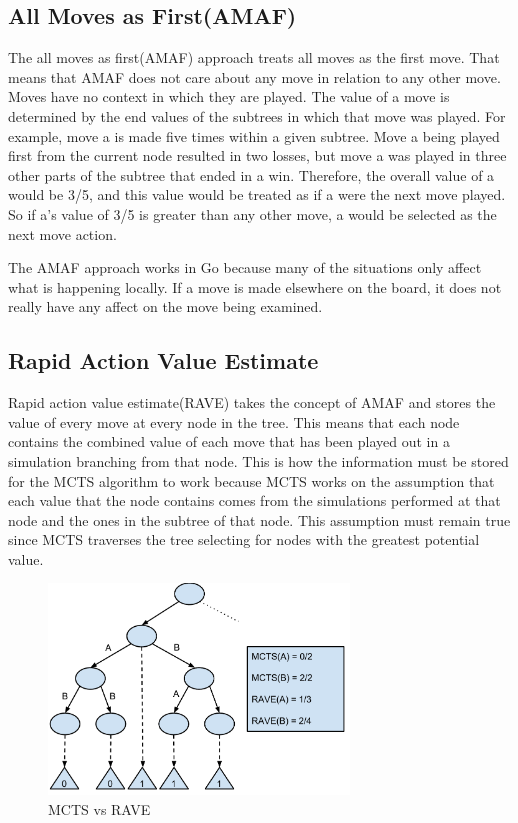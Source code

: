 \documentclass{sig-alternate}
\begin{document}
\subsection{All Moves as First(AMAF)}
The all moves as first(AMAF) approach treats all moves as the first move. That means that AMAF does not care about any move in relation to any other move. Moves have no context in which they are played. The value of a move is determined by the end values of the subtrees in which that move was played. For example, move a is made five times within a given subtree. Move a being played first from the current node resulted in two losses, but move a was played in three other parts of the subtree that ended in a win. Therefore, the overall value of a would be 3/5, and this value would be treated as if a were the next move played. So if a's value of 3/5 is greater than any other move, a would be selected as the next move action.

The AMAF approach works in Go because many of the situations only affect what is happening locally. If a move is made elsewhere on the board, it does not really have any affect on the move being examined.

\subsection{Rapid Action Value Estimate}
Rapid action value estimate(RAVE) takes the concept of AMAF and stores the value of every move at every node in the tree. This means that each node contains the combined value of each move that has been played out in a simulation branching from that node. This is how the information must be stored for the MCTS algorithm to work because MCTS works on the assumption that each value that the node contains comes from the simulations performed at that node and the ones in the subtree of that node. This assumption must remain true since MCTS traverses the tree selecting for nodes with the greatest potential value.

\begin{figure}[h]
	\includegraphics[width=8cm]{RAVEDiagram.pdf}
	\centering
	\caption{MCTS vs RAVE}
	\label{fig:RAVEDiagram}
\end{figure} 
\end{document}
